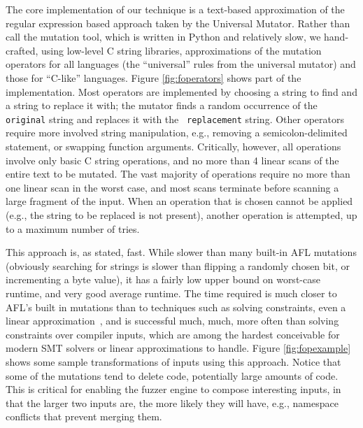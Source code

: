 The core implementation of our technique is a text-based approximation
of the regular expression based approach taken by the Universal
Mutator.  Rather than call the mutation tool, which is written in
Python and relatively slow, we hand-crafted, using low-level C string
libraries, approximations of the mutation operators for all languages
(the ``universal'' rules from the universal mutator) and those for
``C-like'' languages.  Figure \ref{fig:foperators} shows part of the
implementation.  Most operators are implemented by choosing a string
to find and a string to replace it with; the mutator finds a random
occurrence of the {\tt original} string and replaces it with the {\tt
  replacement} string.  Other operators require more involved string
manipulation, e.g., removing a semicolon-delimited statement, or
swapping function arguments.  Critically, however, all operations
involve only basic C string operations, and no more than 4 linear
scans of the entire text to be mutated.  The vast majority of operations require no
more than one linear scan in the worst case, and most scans terminate
before scanning a large fragment of the input.  When an operation that
is chosen cannot be applied (e.g., the string to be replaced is not
present), another operation is attempted, up to a maximum number of
tries.

This approach is, as stated, fast.  While slower than many built-in
AFL mutations (obviously searching for strings is slower than flipping
a randomly chosen bit, or incrementing a byte value), it has a fairly
low upper bound on worst-case runtime, and very good average runtime.  The time required is much
closer to AFL's built in mutations than to techniques such as
solving constraints, even a linear
approximation~\cite{Eclipser}, and is successful much, much, more
often than solving constraints over compiler inputs, which are among
the hardest conceivable for modern SMT solvers or linear
approximations to handle.  Figure \ref{fig:fopexample} shows some
sample transformations of inputs using this approach.  Notice that
some of the mutations tend to delete code, potentially large amounts
of code.  This is critical for enabling the fuzzer engine to compose
interesting inputs, in that the larger two inputs are, the
more likely they will have, e.g., namespace conflicts that prevent
merging them.

